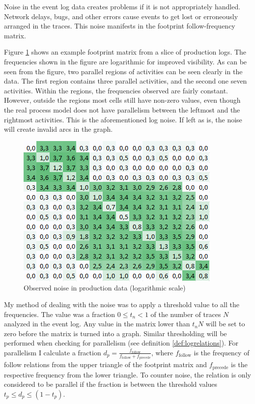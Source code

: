 Noise in the event log data creates problems if it is not appropriately handled. 
Network delays, bugs, and other errors cause events to get lost or erroneously arranged in the traces. 
This noise manifests in the footprint follow-frequency matrix.

Figure \ref{fig:examplenoise} shows an example footprint matrix from a slice of production logs.
The frequencies shown in the figure are logarithmic for improved visibility.
As can be seen from the figure, two parallel regions of activities can be seen clearly in the data.
The first region contains three parallel activities, and the second one seven activities.
Within the regions, the frequencies observed are fairly constant.
However, outside the regions most cells still have non-zero values, even though the real process model
does not have parallelism between the leftmost and the rightmost activities.
This is the aforementioned log noise.
If left as is, the noise will create invalid arcs in the graph.

\begin{figure}[htb]
    \centering \includegraphics[width=0.6\linewidth]{gfx/graphs/noise.png}
    \caption{Observed noise in production data (logarithmic scale)}
    \label{fig:examplenoise}
\end{figure}

My method of dealing with the noise was to apply a threshold value to all the frequencies.
The value was a fraction $0 \le t_n < 1$ of the number of traces $N$ analyzed in the event log.
Any value in the matrix lower than $t_n N$ will be set to zero before the matrix is turned into a graph.
Similar thresholding will be performed when checking for parallelism (see definition \ref{def:logrelations}). 
For parallelism I calculate a fraction $d_p = \frac{f_\text{follow}}{f_\text{follow} + f_\text{precede}}$, where $f_\text{follow}$ is the frequency of follow relations from the upper triangle of the footprint matrix and $f_\text{precede}$ is the respective frequency from the lower triangle.
To counter noise, the relation is only considered to be parallel if the fraction is between the threshold values $t_p \le d_p \le (1 - t_p)$. 

